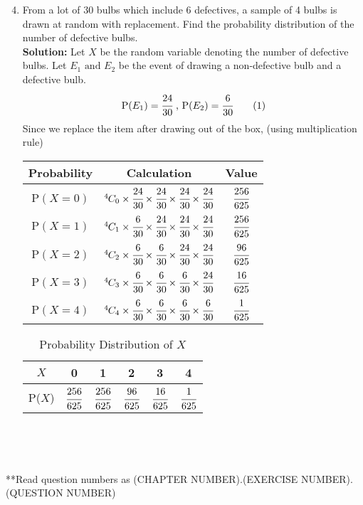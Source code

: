\documentclass[journal,12pt,twocolumn]{IEEEtran}
\newcommand{\solution}{\noindent \textbf{Solution: }}
\newcommand*{\permcomb}[4][0mu]{{{}^{#3}\mkern#1#2_{#4}}}
\newcommand*{\comb}[1][-1mu]{\permcomb[#1]{C}}
\newcommand\numberthis{\addtocounter{equation}{1}\tag{\theequation}}
\newcommand\T{\rule{0pt}{2.6ex}}       %
\newcommand\B{\rule[-1.2ex]{0pt}{0pt}} %
\begin{document}
\begin{enumerate}[label=13.\arabic{enumi}.\arabic{enumii}]
\setcounter{enumi}{3}
\setcounter{enumii}{6}
\item From a lot of 30 bulbs which include 6 defectives, a sample of 4 bulbs is drawn at random with replacement. Find the probability distribution of the number of defective bulbs.\\
	\solution
		Let $X$ be the random variable denoting the number of defective bulbs. Let $E_1 \text{ and } E_2$ be the event of drawing a non-defective bulb and a defective bulb.
		\[ \text{P}(E_1)=\cfrac{24}{30} \text{ , } \text{P}(E_2)=\cfrac{6}{30} \numberthis\]
		Since we replace the item after drawing out of the box, (using multiplication rule)
	\begin{table}[h]
	\small
	\centering
		\begin{tabular}[20pt]{|c|c|c|} \hline
			\T \B \textbf{Probability}&\textbf{Calculation}&\textbf{Value}\\ \hline
			P$(X=0)$ \T \B &$\comb{4}{0} \times \cfrac{24}{30}\times \cfrac{24}{30}\times \cfrac{24}{30}\times \cfrac{24}{30}$ &$\cfrac{256}{625}$ \\[1.5ex] \hline
			P$(X=1)$ \T \B &$\comb{4}{1} \times \cfrac{6}{30}\times \cfrac{24}{30}\times \cfrac{24}{30}\times \cfrac{24}{30}$  &$\cfrac{256}{625}$ \\[1.5ex] \hline
			P$(X=2)$ \T \B &$\comb{4}{2} \times \cfrac{6}{30}\times \cfrac{6}{30}\times \cfrac{24}{30}\times \cfrac{24}{30}$   &$\cfrac{96}{625}$  \\[1.5ex] \hline
			P$(X=3)$ \T \B &$\comb{4}{3} \times \cfrac{6}{30}\times \cfrac{6}{30}\times \cfrac{6}{30}\times \cfrac{24}{30}$    &$\cfrac{16}{625}$  \\[1.5ex] \hline
			P$(X=4)$ \T \B &$\comb{4}{4} \times \cfrac{6}{30}\times \cfrac{6}{30}\times \cfrac{6}{30}\times \cfrac{6}{30}$     &$\cfrac{1}{625}$   \\[1.5ex] \hline
		\end{tabular}
	\end{table} 
	\begin{table}[h!]
	\normalsize
	\centering
			\begin{tabular}[20pt]{|>{}c|a|a|a|a|a|} \hline
			$X$&0&1&2&3&4 \T \\ \hline
			P($X$)&$\cfrac{256}{625}$&$\cfrac{256}{625}$&$\cfrac{96}{625}$&$\cfrac{16}{625}$&$\cfrac{1}{625}$\\[1.5ex] \hline
		\end{tabular}\\[2ex]
		\caption{Probability Distribution of $X$}
	\end{table}\\
\end{enumerate}

\noindent \footnotesize{**Read question numbers as (CHAPTER NUMBER).(EXERCISE NUMBER).(QUESTION NUMBER)}
\end{document}

